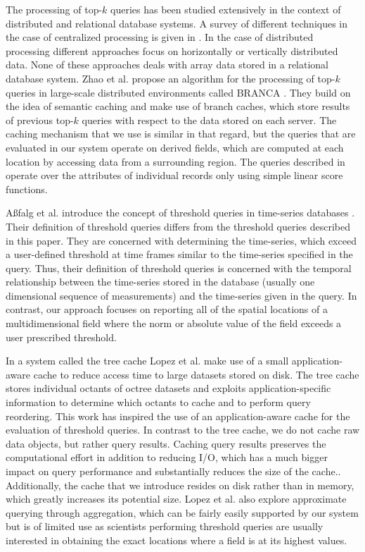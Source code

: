 \documentclass{sig-alternate}
\begin{document}
The processing of top-$k$ queries has been studied extensively in the context of distributed and relational database systems. A survey of different techniques
in the case of centralized processing is given in \cite{Ilyas}. In the case of distributed processing different approaches focus on horizontally 
\cite{Balke, Vlachou} or vertically \cite{Cao, Chaudhuri, Guntzer, Marian, Michel} distributed data. None of these approaches deals with array data stored in
a relational database system. Zhao et al. propose an algorithm for the processing of top-$k$ queries in large-scale distributed environments called BRANCA
\cite{Zhao}. They build on the idea of semantic caching \cite{Ren} and make use of branch caches, which store results of previous top-$k$ queries with respect 
to the data stored on each server. The caching mechanism that we use is similar in that regard, but the queries that are evaluated in our system operate on
derived fields, which are computed at each location by accessing data from a surrounding region. The queries described in \cite{Zhao} operate over the 
attributes of individual records only using simple linear score functions.

A{\ss}falg et al. introduce the concept of threshold queries in time-series databases \cite{Asfalg}. Their definition of threshold queries differs from the threshold
queries described in this paper. They are concerned with determining the time-series, which exceed a user-defined threshold at time frames similar to
the time-series specified in the query. Thus, their definition of threshold queries is concerned with the temporal relationship between the time-series
stored in the database (usually one dimensional sequence of measurements) and the time-series given in the query. In contrast, our approach focuses on
reporting all of the spatial locations of a multidimensional field where the norm or absolute value of the field exceeds a user prescribed threshold.

In a system called the tree cache Lopez et al. \cite{Lopez} make use of a small application-aware cache to reduce access time to large datasets stored on
disk. The tree cache stores individual octants of octree datasets and exploits application-specific information to determine which octants to cache and to 
perform query reordering. This work has inspired the use of an application-aware cache for the evaluation of threshold queries. In contrast to the tree cache,
we do not cache raw data objects, but rather query results. Caching query results preserves the computational effort in addition to reducing I/O, which has a
much bigger impact on query performance and substantially reduces the size of the cache.. Additionally, the cache that we introduce resides on disk rather 
than in memory, which greatly increases its potential size. Lopez et al. also explore approximate querying through aggregation, which can be fairly easily
supported by our system but is of limited use as scientists performing threshold queries are usually interested in obtaining the exact locations where a field is 
at its highest values.
\end{document}
